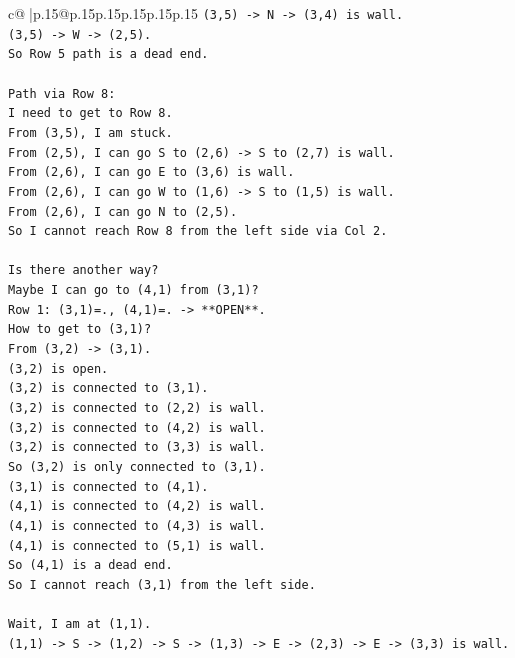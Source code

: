 \documentclass{article}
\begin{document}
{\begin{supertabular}{c@{$\;$}|p{.15\linewidth}@{}p{.15\linewidth}p{.15\linewidth}p{.15\linewidth}p{.15\linewidth}p{.15\linewidth}}
{{{\texttt{(3,5) {-}> N {-}> (3,4) is wall.} \\
\texttt{(3,5) {-}> W {-}> (2,5).} \\
\texttt{So Row 5 path is a dead end.} \\
\\ 
\texttt{Path via Row 8:} \\
\texttt{I need to get to Row 8.} \\
\texttt{From (3,5), I am stuck.} \\
\texttt{From (2,5), I can go S to (2,6) {-}> S to (2,7) is wall.} \\
\texttt{From (2,6), I can go E to (3,6) is wall.} \\
\texttt{From (2,6), I can go W to (1,6) {-}> S to (1,5) is wall.} \\
\texttt{From (2,6), I can go N to (2,5).} \\
\texttt{So I cannot reach Row 8 from the left side via Col 2.} \\
\\ 
\texttt{Is there another way?} \\
\texttt{Maybe I can go to (4,1) from (3,1)?} \\
\texttt{Row 1: (3,1)=., (4,1)=. {-}> **OPEN**.} \\
\texttt{How to get to (3,1)?} \\
\texttt{From (3,2) {-}> (3,1).} \\
\texttt{(3,2) is open.} \\
\texttt{(3,2) is connected to (3,1).} \\
\texttt{(3,2) is connected to (2,2) is wall.} \\
\texttt{(3,2) is connected to (4,2) is wall.} \\
\texttt{(3,2) is connected to (3,3) is wall.} \\
\texttt{So (3,2) is only connected to (3,1).} \\
\texttt{(3,1) is connected to (4,1).} \\
\texttt{(4,1) is connected to (4,2) is wall.} \\
\texttt{(4,1) is connected to (4,3) is wall.} \\
\texttt{(4,1) is connected to (5,1) is wall.} \\
\texttt{So (4,1) is a dead end.} \\
\texttt{So I cannot reach (3,1) from the left side.} \\
\\ 
\texttt{Wait, I am at (1,1).} \\
\texttt{(1,1) {-}> S {-}> (1,2) {-}> S {-}> (1,3) {-}> E {-}> (2,3) {-}> E {-}> (3,3) is wall.} \\
}}}
\end{supertabular}}
\end{document}
